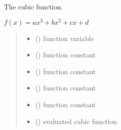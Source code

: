 \documentclass[letterpaper,10pt,english]{sphinxmanual}
\begin{document}
\begin{fulllineitems}
\label{\detokenize{01_utils:skinoptics.utils.cubic}}
\pysigstartsignatures
{}
\pysigstopsignatures
\sphinxAtStartPar
The cubic function.

\sphinxAtStartPar
\(f(x) = ax^3 + bx^2 + cx + d\)
\begin{quote}\begin{description}
\begin{itemize}
\item {} 
\sphinxAtStartPar
{} () \textendash{} function variable

\item {} 
\sphinxAtStartPar
{} () \textendash{} function constant

\item {} 
\sphinxAtStartPar
{} () \textendash{} function constant

\item {} 
\sphinxAtStartPar
{} () \textendash{} function constant

\item {} 
\sphinxAtStartPar
{} () \textendash{} function constant

\end{itemize}

\sphinxAtStartPar
\begin{itemize}
\item {} 
\sphinxAtStartPar
{} () \textendash{} evaluated cubic function

\end{itemize}


\end{description}\end{quote}

\end{fulllineitems}
\end{document}
